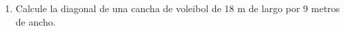 \documentclass[fleqn]{article}
\begin{document}
\begin{enumerate}
\begin{enumerate}
 \end{enumerate}
 \item Calcule la diagonal de una cancha de voleibol de 18 m de largo por 9 metros de ancho.\noanswer
 \end{enumerate}
\end{document}
